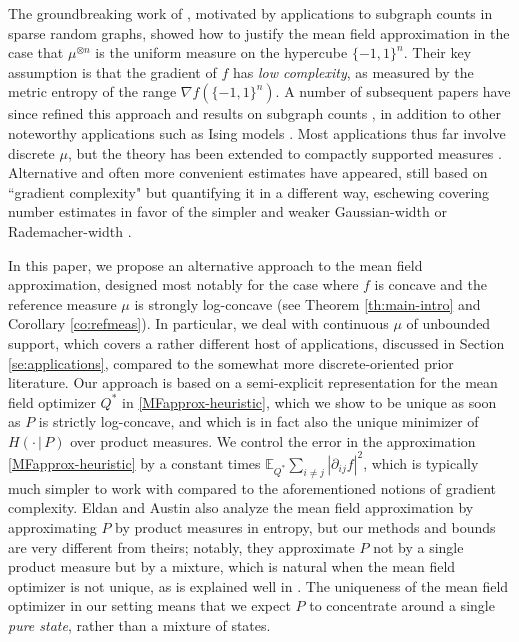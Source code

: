 \documentclass[11pt,reqno]{amsart}
\numberwithin{equation}{section}
\theoremstyle{definition}
\def\E{{\mathbb E}}
\begin{document}
The groundbreaking work of \cite{chatterjee-dembo}, motivated by applications to subgraph counts in sparse random graphs, showed how to justify the mean field approximation in the case that $\mu^{\otimes n}$ is the uniform measure on the hypercube $\{-1,1\}^n$. Their key assumption is that the gradient of $f$ has \emph{low complexity}, as measured by the metric entropy of the range $\nabla f(\{-1,1\}^n)$. A number of subsequent papers have since refined this approach and results on subgraph counts \cite{cook-dembo,cook2021regularity,lubetzky2017variational}, in addition to other noteworthy applications such as Ising models \cite{augeri1,augeri2,basak-mukherjee,deb-mukherjee,eldan1,jain2019mean}.
Most applications thus far involve discrete $\mu$, but the theory has been extended to compactly supported measures \cite{augeri1,austin2019structure,yan2020nonlinear}.
Alternative and often more convenient estimates have appeared, still based on ``gradient complexity" but quantifying it in a different way, eschewing covering number estimates in favor of the simpler and weaker Gaussian-width \cite{eldan1,eldan2020taming,eldan-gross} or Rademacher-width \cite{augeri2}. 

	In this paper, we propose an alternative approach to the mean field approximation, designed most notably for the case where $f$ is concave and the reference measure $\mu$ is strongly log-concave (see Theorem \ref{th:main-intro} and Corollary \ref{co:refmeas}).
	In particular, we deal with continuous $\mu$ of unbounded support, which covers a rather different host of applications, discussed in Section \ref{se:applications}, compared to the somewhat more discrete-oriented prior literature.
	Our approach is based on a semi-explicit representation for the mean field optimizer $Q^*$ in \eqref{MFapprox-heuristic}, which we show to be unique as soon as $P$ is strictly log-concave, and which is in fact also the unique minimizer of $H(\cdot\,|\,P)$ over product measures.
	We control the error in the approximation \eqref{MFapprox-heuristic} by a constant times $\E_{Q^*}\sum_{i \neq j} |\partial_{ij}f|^2$, which is typically much simpler to work with compared to the aforementioned notions of gradient complexity.
	Eldan \cite{eldan1,eldan2020taming} and Austin \cite{austin2019structure} also analyze the mean field approximation by  approximating $P$ by product measures in entropy, but our methods and bounds are very different from theirs; notably, they approximate $P$ not by a single product measure but by a mixture, which is natural when the mean field optimizer is not unique, as is explained well in \cite{eldan1}. The uniqueness of  the mean field optimizer in our  setting means that we expect $P$ to concentrate around a single \emph{pure state}, rather than a mixture of states. 
\end{document}
